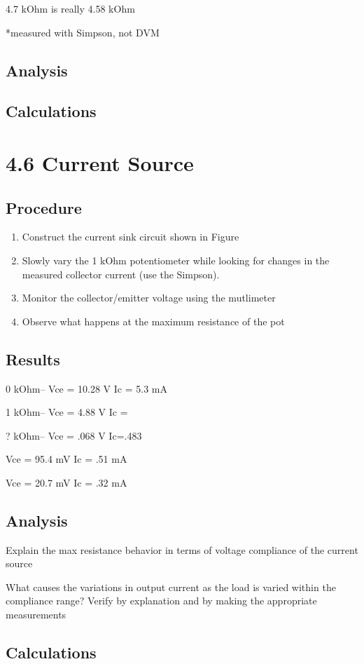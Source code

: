 \documentclass[12pt,letterpaper]{report}
\begin{document}
4.7 kOhm is really 4.58 kOhm

*measured with Simpson, not DVM

\subsection*{Analysis}


\subsection*{Calculations}

\section*{4.6 Current Source}
\subsection*{Procedure}

\begin{enumerate}
\item Construct the current sink circuit shown in Figure %
\item Slowly vary the 1 kOhm potentiometer while looking for changes in the measured collector current (use the Simpson).
\item Monitor the collector/emitter voltage using the mutlimeter
\item Observe what happens at the maximum resistance of the pot
\end{enumerate}

\subsection*{Results}

%
%
%

0 kOhm--
Vce = 10.28 V
Ic = 5.3 mA

1 kOhm--
Vce = 4.88 V
Ic = 

? kOhm--
Vce = .068 V
Ic=.483

Vce = 95.4 mV
Ic = .51 mA

Vce = 20.7 mV
Ic = .32 mA

\subsection*{Analysis}

Explain the max resistance behavior in terms of voltage compliance of the current source

What causes the variations in output current as the load is varied within the compliance range? Verify by explanation and by making the appropriate measurements

\subsection*{Calculations}
\end{document}
